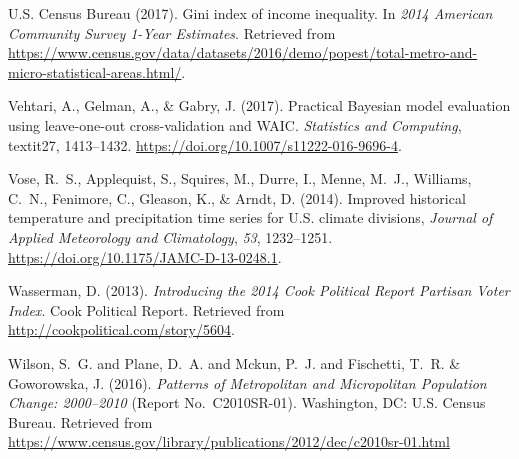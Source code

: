 \documentclass[draft]{agujournal}
\begin{document}
\begin{thebibliography}{33}
  {U.S. Census Bureau} (2017).
  Gini index of income inequality.
  In \textit{2014 American Community Survey 1-Year Estimates}.
  Retrieved from
  \url{https://www.census.gov/data/datasets/2016/demo/popest/total-metro-and-micro-statistical-areas.html/}.

  Vehtari, A., Gelman, A., \& Gabry, J. (2017).
  Practical {Bayesian} model evaluation using leave-one-out cross-validation and {WAIC}.
  \textit{Statistics and Computing}, textit{27}, 1413--1432.
  \url{https://doi.org/10.1007/s11222-016-9696-4}.

  Vose, R.~S., Applequist, S., Squires, M., Durre, I., Menne, M.~J., Williams, C.~N.,
  Fenimore, C., Gleason, K., \& Arndt, D. (2014).
  Improved historical temperature and precipitation time series for {U}.{S}.
  climate divisions,
  \textit{Journal of  Applied Meteorology and Climatology}, \textit{53}, 1232--1251.
  \url{https://doi.org/10.1175/JAMC-D-13-0248.1}.

  Wasserman, D. (2013).
  \textit{Introducing the 2014 {C}ook {P}olitical {R}eport {P}artisan {V}oter
  {I}ndex}.
  Cook Political Report.
  Retrieved from
  \url{http://cookpolitical.com/story/5604}.

  Wilson, S.~G. and Plane, D.~A. and Mckun, P.~J. and Fischetti, T.~R. \&
  Goworowska, J. (2016).
  \textit{Patterns of Metropolitan and Micropolitan Population Change: 2000--2010\/}
  (Report No.~C2010SR-01).
  Washington, DC:  U.S. Census Bureau.
  Retrieved from
  \url{https://www.census.gov/library/publications/2012/dec/c2010sr-01.html}

\end{thebibliography}

\listofchanges
\end{document}
